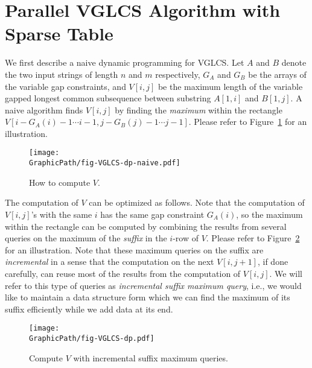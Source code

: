 \section{Parallel VGLCS Algorithm with Sparse Table} %
\label{sec:parallelVGLCS}


We first describe a naive dynamic programming for VGLCS.  Let $A$ and
$B$ denote the two input strings of length $n$ and $m$ respectively,
$G_A$ and $G_B$ be the arrays of the variable gap constraints, and
$V[i, j]$ be the maximum length of the variable gapped longest common
subsequence between substring $A[1, i]$ and $B[1, j]$.  A naive
algorithm finds $V[i, j]$ by finding the {\em maximum} within the
rectangle $V[i-G_A(i)-1 \cdots i-1, j-G_B(j)-1 \cdots j-1]$.  Please
refer to Figure~\ref{fig:fig-VGLCS-dp-naive} for an illustration.

\begin{figure}[!thb]
  \texttt{[image: \\GraphicPath/fig-VGLCS-dp-naive.pdf]}
  \caption{How to compute $V$.}
  \label{fig:fig-VGLCS-dp-naive}
\end{figure}

The computation of $V$ can be optimized as follows.  Note that the
computation of $V[i, j]$'s with the same $i$ has the same gap
constraint $G_A(i)$, so the maximum within the rectangle can be
computed by combining the results from several queries on the maximum
of the {\em suffix} in the $i$-row of $V$.  Please refer to
Figure~\ref{fig:fig-VGLCS-dp} for an illustration.  Note that these
maximum queries on the suffix are {\em incremental} in a sense that
the computation on the next $V[i, j + 1]$, if done carefully, can
reuse most of the results from the computation of $V[i, j]$.  We will
refer to this type of queries as {\em incremental suffix maximum
  query}, i.e., we would like to maintain a data structure form which
we can find the maximum of its suffix efficiently while we add data at
its end.

\begin{figure}[!thb]
  \texttt{[image: \\GraphicPath/fig-VGLCS-dp.pdf]}
  \caption{Compute $V$ with incremental suffix maximum queries.}
  \label{fig:fig-VGLCS-dp}
\end{figure}

